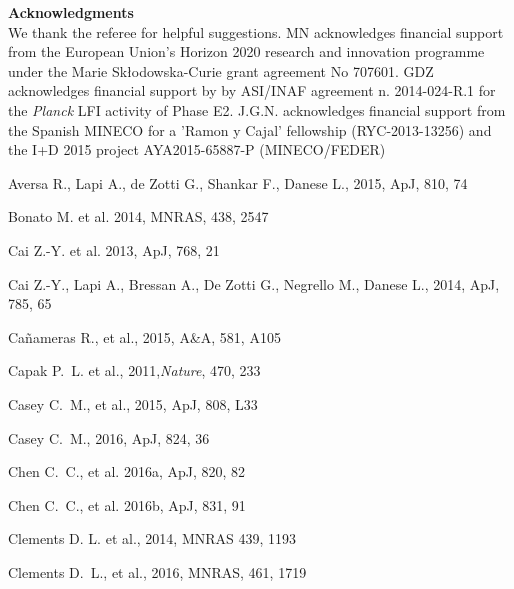 \documentclass[useAMS,usenatbib]{mn2e}
\begin{document}
$~$ \\
{\bf Acknowledgments} \\
We thank the referee for helpful suggestions.
MN acknowledges financial support from the European Union's Horizon
2020 research and innovation 
programme under the Marie Sk{\l}odowska-Curie grant agreement No 707601.
GDZ acknowledges financial support by by ASI/INAF agreement
n. 2014-024-R.1 for the {\it Planck} LFI activity of Phase
E2. J.G.N. acknowledges financial support from the Spanish MINECO for
a 'Ramon y Cajal' fellowship (RYC-2013-13256) 
and the I+D 2015 project AYA2015-65887-P (MINECO/FEDER)


\begin{thebibliography}{}

 Aversa R., Lapi A., de Zotti G., Shankar F., Danese L., 2015, ApJ, 810, 74

 Bonato M. et al. 2014, MNRAS, 438, 2547

 Cai Z.-Y. et al. 2013, ApJ, 768, 21


 Cai Z.-Y., Lapi A., Bressan A., De Zotti G., Negrello M., Danese L., 2014, ApJ, 785, 65

 Ca{\~n}ameras R., et al., 2015, A\&A, 581, A105

 Capak P.~L. et al., 2011,{\it Nature}, 470, 233

 Casey C.~M., et al., 2015, ApJ, 808, L33

 Casey C.~M., 2016, ApJ, 824, 36

 Chen C.~C., et al. 2016a, ApJ, 820, 82

 Chen C.~C., et al. 2016b, ApJ, 831, 91

 Clements D. L. et al., 2014, MNRAS 439, 1193

 Clements D.~L., et al., 2016, MNRAS, 461, 1719


\end{thebibliography}
\end{document}
